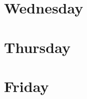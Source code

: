 \documentclass[a4paper]{book}
\begin{document}
\begin{landscape}
\chapter{Wednesday}

%

\chapter{Thursday}

%

\chapter{Friday}

%

\end{landscape}
\end{document}
